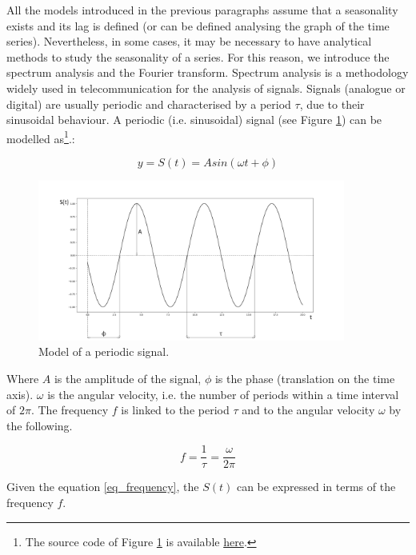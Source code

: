 All the models introduced in the previous paragraphs assume that a seasonality exists and its lag is defined (or can be defined analysing the graph of the time series). Nevertheless, in some cases, it may be necessary to have analytical methods to study the seasonality of a series. For this reason, we introduce the spectrum analysis and the Fourier transform. Spectrum analysis is a methodology widely used in telecommunication for the analysis of signals. Signals (analogue or digital) are usually periodic and characterised by a period $\tau$, due to their sinusoidal behaviour. A periodic (i.e. sinusoidal) signal (see Figure \ref{fig_signal}) can be modelled as\footnote{The source code of Figure \ref{fig_signal} is available \href{https://github.com/aletuf93/logproj/blob/master/examples/03.\%20Statistics.ipynb}{here}.}.:

\begin{equation}
y=S(t)=Asin(\omega t+\phi)
\label{eq_signal}
\end{equation}


\begin{figure}[hbt!]
\centering
\includegraphics[width=0.9\textwidth]{SectionLetsMath/elemStat_figures/fig_signal.png}
\captionsetup{type=figure}
\caption{Model of a periodic signal.}
\label{fig_signal}
\end{figure}

Where $A$ is the amplitude of the signal, $\phi$ is the phase (translation on the time axis). $\omega$ is the angular velocity, i.e. the number of periods within a time interval of $2\pi$. The frequency $f$ is linked to the period $\tau$ and to the angular velocity $\omega$ by the following.

\begin{equation}
f=\frac{1}{\tau}=\frac{\omega}{2\pi}
\label{eq_frequency}
\end{equation}

Given the equation \ref{eq_frequency}, the $S\left(t\right)$ can be expressed in terms of the frequency $f$.

